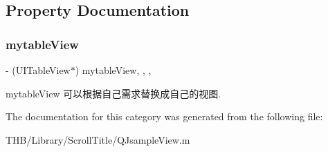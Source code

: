 \subsection{Property Documentation}
\mbox{\label{category_q_jsample_view_07_08_a226b1d79ff35b1dc2bc1c9e64f252584}} 
\subsubsection{\texorpdfstring{mytable\+View}{mytableView}}
{\footnotesize\ttfamily -\/ (U\+I\+Table\+View$\ast$) mytable\+View\hspace{0.3cm}{\ttfamily [read]}, {\ttfamily [write]}, {\ttfamily [nonatomic]}, {\ttfamily [strong]}}

mytable\+View 可以根据自己需求替换成自己的视图. 

The documentation for this category was generated from the following file\+:\begin{DoxyCompactItemize}
\item 
T\+H\+B/\+Library/\+Scroll\+Title/Q\+Jsample\+View.\+m\end{DoxyCompactItemize}
